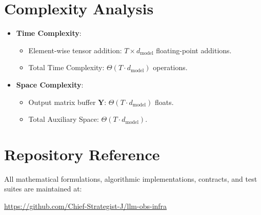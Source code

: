 \documentclass[11pt,a4paper]{article}
\theoremstyle{definition}
\begin{document}
\section{Complexity Analysis}
\begin{itemize}
    \item \textbf{Time Complexity}:
    \begin{itemize}
        \item Element-wise tensor addition: $T \times d_{\text{model}}$ floating-point additions.
        \item Total Time Complexity: $\Theta(T \cdot d_{\text{model}})$ operations.
    \end{itemize}
    \item \textbf{Space Complexity}:
    \begin{itemize}
        \item Output matrix buffer $\mathbf{Y}$: $\Theta(T \cdot d_{\text{model}})$ floats.
        \item Total Auxiliary Space: $\Theta(T \cdot d_{\text{model}})$.
    \end{itemize}
\end{itemize}

\section{Repository Reference}
All mathematical formulations, algorithmic implementations, contracts, and test suites are maintained at:
\begin{center}
\url{https://github.com/Chief-Strategist-J/llm-obs-infra}
\end{center}
\end{document}
